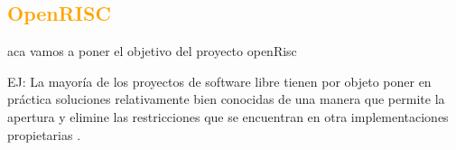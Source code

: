 \documentclass[a4paper,11pt]{article}
\begin{document}
		

		\subsection{\textcolor{orange}{OpenRISC}}

aca vamos a poner el objetivo del proyecto openRisc 

EJ:
 La mayoría de los proyectos de software libre tienen por objeto poner en práctica soluciones relativamente bien conocidas de una manera que permite la apertura y elimine las restricciones que se encuentran en otra implementaciones propietarias . 
\end{document}
